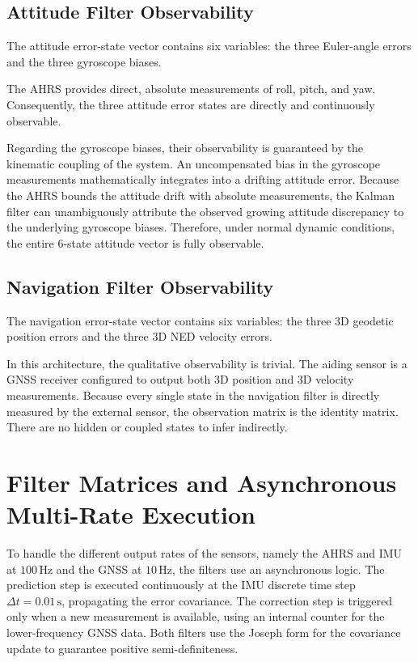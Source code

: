 \documentclass[a4paper,twoside,openany]{report}
\begin{document}
\subsection{Attitude Filter Observability}

The attitude error-state vector contains six variables: the three Euler-angle errors and the three gyroscope biases.

The AHRS provides direct, absolute measurements of roll, pitch, and yaw. Consequently, the three attitude error states are directly and continuously observable.

Regarding the gyroscope biases, their observability is guaranteed by the kinematic coupling of the system. An uncompensated bias in the gyroscope measurements mathematically integrates into a drifting attitude error. Because the AHRS bounds the attitude drift with absolute measurements, the Kalman filter can unambiguously attribute the observed growing attitude discrepancy to the underlying gyroscope biases. Therefore, under normal dynamic conditions, the entire 6-state attitude vector is fully observable.

\subsection{Navigation Filter Observability}

The navigation error-state vector contains six variables: the three 3D geodetic position errors and the three 3D NED velocity errors.

In this architecture, the qualitative observability is trivial. The aiding sensor is a GNSS receiver configured to output both 3D position and 3D velocity measurements. Because every single state in the navigation filter is directly measured by the external sensor, the observation matrix is the identity matrix. There are no hidden or coupled states to infer indirectly.

\section{Filter Matrices and Asynchronous Multi-Rate Execution}

To handle the different output rates of the sensors, namely the AHRS and IMU at $100\,\mathrm{Hz}$ and the GNSS at $10\,\mathrm{Hz}$, the filters use an asynchronous logic. The prediction step is executed continuously at the IMU discrete time step $\Delta t = 0.01\,\mathrm{s}$, propagating the error covariance. The correction step is triggered only when a new measurement is available, using an internal counter for the lower-frequency GNSS data. Both filters use the Joseph form for the covariance update to guarantee positive semi-definiteness.
\end{document}
